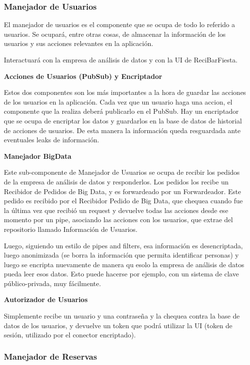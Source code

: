 \subsubsection{Manejador de Usuarios}

El manejador de usuarios es el componente que se ocupa de todo lo referido a usuarios. Se ocupará, entre otras cosas, de almacenar la información de los usuarios y sus acciones relevantes en la aplicación. 

Interactuará con la empresa de análisis de datos y con la UI de ReciBarFiesta.

\textbf{Acciones de Usuarios (PubSub) y Encriptador}

Estos dos componentes son los más importantes a la hora de guardar las acciones de los usuarios en la aplicación. Cada vez que un usuario haga una accion, el componente que la realiza deberá publicarlo en el PubSub. Hay un encriptador que se ocupa de encriptar los datos y guardarlos en la base de datos de historial de acciones de usuarios. De esta manera la información queda resguardada ante eventuales leaks de información.

\textbf{Manejador BigData}

Este sub-componente de Manejador de Usuarios se ocupa de recibir los pedidos de la empresa de análisis de datos y responderlos. Los pedidos los recibe un Recibidor de Pedidos de Big Data, y es forwardeado por un Forwardeador. Este pedido es recibido por el Recibidor Pedido de Big Data, que chequea cuando fue la última vez que recibió un request y devuelve todas las acciones desde ese momento por un pipe, asociando las acciones con los usuarios, que extrae del repositorio
llamado Información de Usuarios.

Luego, siguiendo un estilo de pipes and filters, esa información es desencriptada, luego anonimizada (se borra la información que permita identificar personas) y luego se encripta nuevamente de manera qu esolo la empresa de análisis de datos pueda leer esos datos. Esto puede hacerse por ejemplo, con un sistema de clave público-privada, muy fácilmente.

\textbf{Autorizador de Usuarios}

Simplemente recibe un usuario y una contraseña y la chequea contra la base de datos de los usuarios, y devuelve un token que podrá utilizar la UI (token de sesión, utilizado por el conector encriptado).

\subsubsection{Manejador de Reservas}


